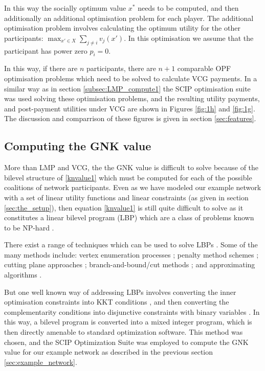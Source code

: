 In this way the socially optimum value $x^*$ needs to be computed, and then additionally an additional optimisation problem for each player.
The additional optimisation problem involves calculating the optimum utility for the other participants: $\max_{x'\in X}\sum_{j\ne i}v_j(x')$.
In this optimisation we assume that the participant has power zero $p_i=0$.

In this way, if there are $n$ participants, there are $n+1$ comparable OPF optimisation problems which need to be solved to calculate VCG payments.
In a similar way as in section \ref{subsec:LMP_compute1} the SCIP optimisation suite was used solving these optimisation problems, and the resulting utility payments, and post-payment utilities under VCG are shown in Figures \ref{fig:1h} and \ref{fig:1g}.
The discussion and comparrison of these figures is given in section \ref{sec:features}.


\subsection{Computing the GNK value}\label{subsec:gnk_compute1}

More than LMP and VCG, the the GNK value is difficult to solve because of the bilevel structure of \eqref{knvalue1} which must be computed for each of the possible coalitions of network participants.
Even as we have modeled our example network with a set of linear utility functions and linear constraints (as given in section \ref{sec:the_setup}), then equation \eqref{knvalue1} is still quite difficult to solve as it constitutes a linear bilevel program (LBP) which are a class of problems known to be NP-hard \cite{DBLP:journals/tec/SinhaMD18,Ben-Ayed:1990:CDB}.

There exist a range of techniques which can be used to solve LBPs \cite{DBLP:journals/tec/SinhaMD18,S.Dempe.Optimisations}.
Some of the many methods include: vertex enumeration processes \cite{Bialas:1984:TLP:2784019.2784026,Shi:2005:EKA:2641854.2642183,LIU1995644}; penalty method schemes \cite{KleinertSchmidt2019,ONAL1993126,dempe_optimisation111};
cutting plane approaches \cite{cuttingplane1};
branch-and-bound/cut methods \cite{SHI200551,Hansen:1992:NBR:141164.141181,Audet2007};
and approximating algorithms \cite{Pineda2018,rnnlbp1,genetic_algirthm_blp}.

But one well known way of addressing LBPs involves converting the inner optimisation constraints into KKT conditions \cite{kuhn1951nonlinear}, and then converting the complementarity conditions into disjunctive constraints with binary variables \cite{Fortuny-Amat1981,Pineda2018}.
In this way, a bilevel program is converted into a mixed integer program, which is then directly amenable to standard optimization software.
This method was chosen, and the SCIP Optimization Suite was employed to compute the GNK value for our example network as described in the previous section \ref{sec:example_network}.

